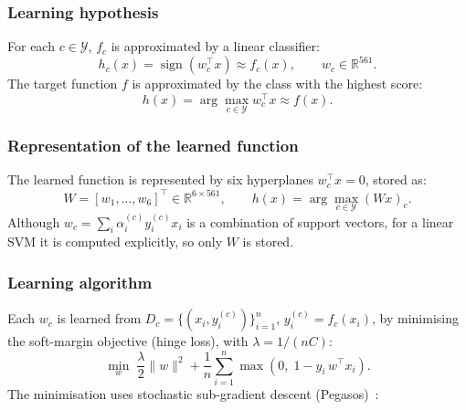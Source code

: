 \documentclass[a4paper, 11pt]{article}
\begin{document}
\subsubsection{Learning hypothesis}

For each $c \in \mathcal{Y}$, $f_c$ is approximated by a linear classifier:
\[
  h_c(x) = \operatorname{sign}\!\left(w_c^\top x\right) \approx f_c(x), \qquad w_c \in \mathbb{R}^{561}.
\]
The target function $f$ is approximated by the class with the highest score:
\[
  h(x) = \arg\max_{c \in \mathcal{Y}} w_c^\top x \approx f(x).
\]

\subsubsection{Representation of the learned function}

The learned function is represented by six hyperplanes $w_c^\top x = 0$, stored as:
\[
  W = \left[w_1, \dots, w_6\right]^\top \in \mathbb{R}^{6 \times 561}, \qquad
  h(x) = \arg\max_{c \in \mathcal{Y}} \left(W x\right)_c .
\]
Although $w_c = \sum_i \alpha_i^{(c)} y_i^{(c)} x_i$ is a combination of support vectors, for a linear SVM it is computed explicitly, so only $W$ is stored.

\subsubsection{Learning algorithm}

Each $w_c$ is learned from $D_c = \{(x_i, y_i^{(c)})\}_{i=1}^{n}$, $y_i^{(c)} = f_c(x_i)$, by minimising the soft-margin objective (hinge loss), with $\lambda = 1/(nC)$:
\[
  \min_{w}\; \frac{\lambda}{2}\lVert w \rVert^2 + \frac{1}{n}\sum_{i=1}^{n} \max\!\left(0,\; 1 - y_i\, w^\top x_i\right).
\]
The minimisation uses stochastic sub-gradient descent (Pegasos)~\cite{Shalev-Shwartz2011}:
\end{document}
